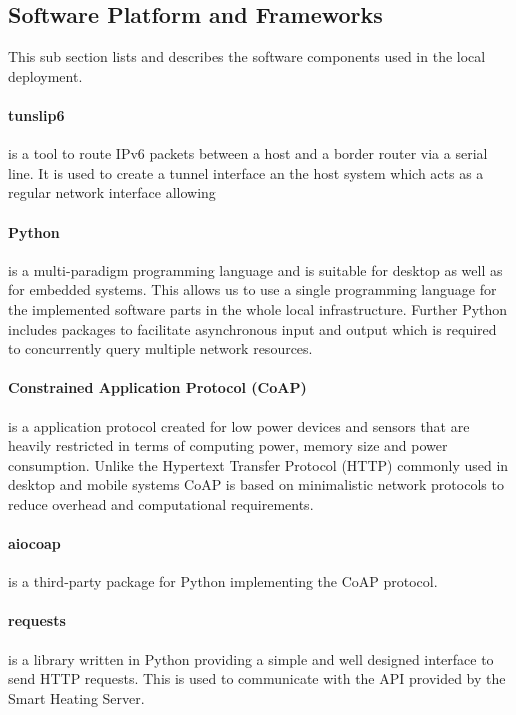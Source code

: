 \subsection{Software Platform and Frameworks}

This sub section lists and describes the software components used in the local deployment.

\paragraph{tunslip6} is a tool to route IPv6 packets between a host and a border router via a serial line.
It is used to create a tunnel interface an the host system which acts as a regular network interface allowing

\paragraph{Python} is a multi-paradigm programming language and is suitable for desktop as well as for embedded systems.
This allows us to use a single programming language for the implemented software parts in the whole local infrastructure.
Further Python includes packages to facilitate asynchronous input and output which is required to concurrently query multiple network resources.

\paragraph{Constrained Application Protocol (CoAP)} \cite{rfc7252} is a application protocol created for low power devices and sensors that are heavily restricted in terms of computing power, memory size and power consumption.
Unlike the Hypertext Transfer Protocol (HTTP) commonly used in desktop and mobile systems CoAP is based on minimalistic network protocols to reduce overhead and computational requirements.

\paragraph{aiocoap} is a third-party package for Python implementing the CoAP protocol.

\paragraph{requests} is a library written in Python providing a simple and well designed interface to send HTTP requests.
This is used to communicate with the API provided by the Smart Heating Server.

